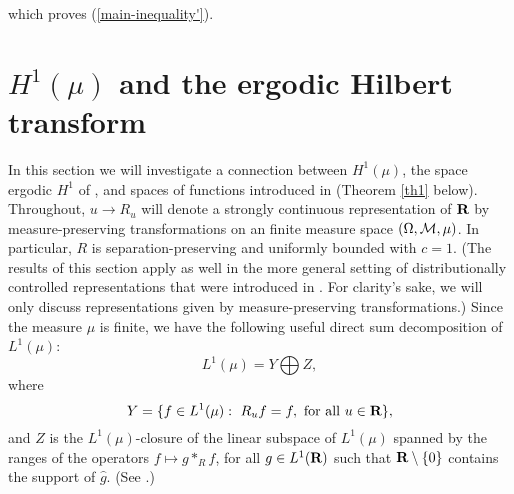 which proves
(\ref{main-inequality'}).
\section{$H^1(\mu)$ and the ergodic Hilbert transform}
\newtheorem{th1}{Theorem}[section]
\newtheorem{sec4prop1}[th1]{Proposition}
\newtheorem{sec4prop2}[th1]{Proposition}
\newtheorem{sec4prop3}[th1]{Proposition}
\newtheorem{sec4prop4}[th1]{Proposition}
\newtheorem{remark1}[th1]{Remark}
\newtheorem{lemma-th1}[th1]{Lemma}
\newtheorem{th2}[th1]{Theorem}
\newtheorem{corollary-th2}[th1]{Corollary}

In this section we will investigate a connection
between $H^1(\mu)$,
 the space ergodic $H^1$ of \cite{cw2},
and spaces of functions introduced in
\cite{abg2} (Theorem \ref{th1} below).
Throughout, $u\rightarrow R_u$ will denote a
strongly continuous
representation of $\R$ by measure-preserving transformations
on an finite measure space $(\Omega, {\cal M},\mu)$.
In particular, $R$ is 
separation-preserving and uniformly bounded with
$c=1$.  (The results of this section apply as well
 in the more general
setting of distributionally controlled 
representations that were introduced in \cite{abg2}.  
For clarity's sake, we will only discuss 
representations given by measure-preserving transformations.)
Since the measure $\mu$ is finite, 
we have the following useful direct sum decomposition
of $L^1(\mu)$:
$$L^1(\mu)=Y \bigoplus Z,$$
where 
$$Y=\{f\in L^1(\mu):\ R_uf=f,\ {\rm for\ all}\ u\in\R\},$$
and $Z$ is the $L^1(\mu)$-closure of the linear subspace of
$L^1(\mu)$ spanned by the ranges of the 
operators $f\mapsto g*_R f$, for all $g\in L^1(\R)$
such that $\R\setminus \{0\}$ contains the
support of $\widehat{g}$.  (See \cite[Proposition (3.19)]{abg2}.)

